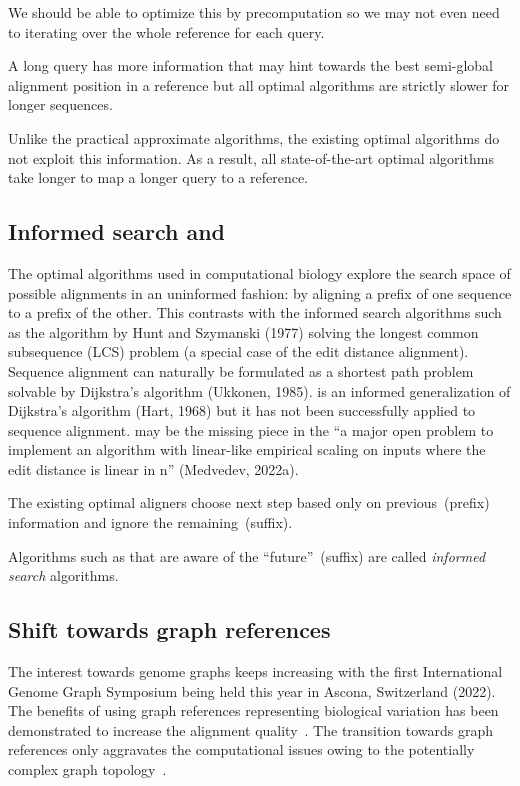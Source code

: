 We should be able to optimize this by precomputation so we may not even need to
iterating over the whole reference for each query.

\begin{paradox}
    A long query has more information that may hint towards the best semi-global
    alignment position in a reference but all optimal algorithms are strictly
    slower for longer sequences.
\end{paradox}

Unlike the practical approximate algorithms, the existing optimal algorithms do
not exploit this information. As a result, all state-of-the-art optimal
algorithms take longer to map a longer query to a reference. 

\subsection*{Informed search and \A}

The optimal algorithms used in computational biology explore the search space of
possible alignments in an uninformed fashion: by aligning a prefix of one
sequence to a prefix of the other. This contrasts with the informed search
algorithms such as the algorithm by Hunt and Szymanski (1977) solving the
longest common subsequence (LCS) problem (a special case of the edit distance
alignment). Sequence alignment can naturally be formulated as a shortest path
problem solvable by Dijkstra's algorithm (Ukkonen, 1985). \A is an informed
generalization of Dijkstra's algorithm (Hart, 1968) but it has not been
successfully applied to sequence alignment. \A may be the missing piece in the
“a major open problem to implement an algorithm with linear-like empirical
scaling on inputs where the edit distance is linear in n” (Medvedev, 2022a).

\begin{observation}
    The existing optimal aligners choose next step based only on
    previous~(prefix) information and ignore the remaining~(suffix).
\end{observation}

Algorithms such as \A that are aware of the ``future''~(suffix) are called
\emph{informed search} algorithms.

\subsection*{Shift towards graph references}

The interest towards genome graphs keeps increasing with the first International
Genome Graph Symposium being held this year in Ascona, Switzerland (2022). The
benefits of using graph references representing biological variation has been
demonstrated to increase the alignment quality~\citep{garrison_variation_2018}.
The transition towards graph references only aggravates the computational issues
owing to the potentially complex graph topology~\citep{equi_complexity_2019}.
